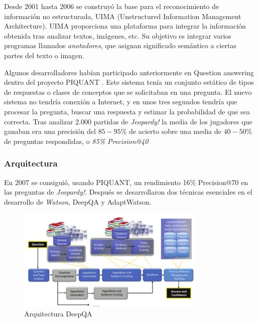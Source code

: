 \documentclass[paper=a4, fontsize=10pt]{scrartcl} %
\numberwithin{equation}{section} %
\numberwithin{figure}{section} %
\numberwithin{table}{section} %
\begin{document}
Desde 2001 hasta 2006 se construyó la base para el reconocimiento de información no estructurada, UIMA (Unstructured
Information Management Architecture). %
UIMA proporciona una plataforma para integrar la información obtenida tras analizar textos, imágenes, etc.
Su objetivo es integrar varios programas llamados \textit{anotadores}, que asignan significado semántico a ciertas partes del texto o imagen.


Algunos desarrolladores habían participado anteriormente en Question answering dentro del proyecto PIQUANT \cite{piquant}. %
Este sistema tenía un conjunto estático de tipos de respuestas o clases de conceptos que se solicitaban en una pregunta.
El nuevo sistema no tendría conexión a Internet, y en unos tres segundos tendría que procesar la pregunta, buscar una respuesta y estimar la probabilidad de que sea correcta.
Tras analizar $2.000$ partidas de \textit{Jeopardy!} la media de los jugadores que ganaban era una precisión del $85-95\%$ de acierto sobre una media de $40-50\%$ de preguntas respondidas, o 
\textit{85\% Precision@40}


\subsubsection{Arquitectura}
En $2007$ se consiguió, usando PIQUANT, un rendimiento 16\% Precision@70 en las preguntas de \textit{Jeopardy!}.
Después se desarrollaron dos técnicas esenciales en el desarrollo de \textit{Watson}, DeepQA %
y AdaptWatson. %

\begin{figure}[H]
	\centering
	\label{tiw-deepqa}
	\includegraphics[width=0.8\textwidth]{./Imagenes/deepQA.png}
	\caption{Arquitectura DeepQA}
\end{figure}
\end{document}
